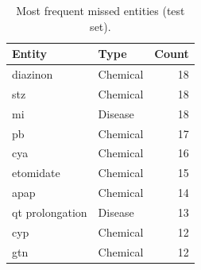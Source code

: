 \begin{table}[t]
\centering
\small
\caption{Most frequent missed entities (test set).}
\label{tab:topmissed}
\begin{tabular}{llr}
\toprule
Entity & Type & Count \\
\midrule
diazinon & Chemical & 18 \\
stz & Chemical & 18 \\
mi & Disease & 18 \\
pb & Chemical & 17 \\
cya & Chemical & 16 \\
etomidate & Chemical & 15 \\
apap & Chemical & 14 \\
qt prolongation & Disease & 13 \\
cyp & Chemical & 12 \\
gtn & Chemical & 12 \\
\bottomrule
\end{tabular}
\end{table}
